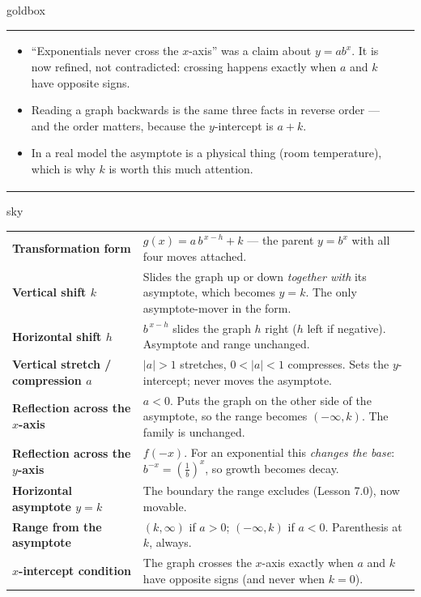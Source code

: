 \documentclass[10pt]{article}
\begin{document}
\begin{skillbox}{goldbox}
\begin{tabularx}{\linewidth}{@{}X|X@{}}
\begin{itemize}[leftmargin=1.1em, nosep, after=\vspace{2pt}]
  \item ``Exponentials never cross the $x$-axis'' was a claim about $y=ab^{x}$. It is now refined, not contradicted: crossing happens exactly when $a$ and $k$ have opposite signs.
  \item Reading a graph backwards is the same three facts in reverse order --- and the order matters, because the $y$-intercept is $a+k$.
  \item In a real model the asymptote is a physical thing (room temperature), which is why $k$ is worth this much attention.
\end{itemize}
\end{tabularx}
\end{skillbox}

\begin{skillbox}{sky}
\renewcommand{\arraystretch}{1.3}
\begin{tabularx}{\linewidth}{@{}l X@{}}
\textbf{Transformation form} & $g(x)=a\,b^{\,x-h}+k$ --- the parent $y=b^{x}$ with all four moves attached. \\
\textbf{Vertical shift $k$} & Slides the graph up or down \emph{together with} its asymptote, which becomes $y=k$. The only asymptote-mover in the form. \\
\textbf{Horizontal shift $h$} & $b^{\,x-h}$ slides the graph $h$ right ($h$ left if negative). Asymptote and range unchanged. \\
\textbf{Vertical stretch / compression $a$} & $|a|>1$ stretches, $0<|a|<1$ compresses. Sets the $y$-intercept; never moves the asymptote. \\
\textbf{Reflection across the $x$-axis} & $a<0$. Puts the graph on the other side of the asymptote, so the range becomes $(-\infty,k)$. The family is unchanged. \\
\textbf{Reflection across the $y$-axis} & $f(-x)$. For an exponential this \emph{changes the base}: $b^{-x}=\left(\frac1b\right)^{x}$, so growth becomes decay. \\
\textbf{Horizontal asymptote $y=k$} & The boundary the range excludes (Lesson 7.0), now movable. \\
\textbf{Range from the asymptote} & $(k,\infty)$ if $a>0$; $(-\infty,k)$ if $a<0$. Parenthesis at $k$, always. \\
\textbf{$x$-intercept condition} & The graph crosses the $x$-axis exactly when $a$ and $k$ have opposite signs (and never when $k=0$). \\
\end{tabularx}
\end{skillbox}
\end{document}
